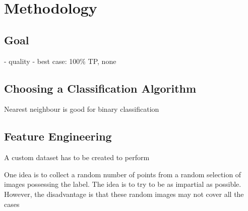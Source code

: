 \documentclass[dissertation.tex]{subfiles}
\begin{document}
\chapter{Methodology}

\section{Goal}
- quality - best case: 100\% TP, none

\section{Choosing a Classification Algorithm}
Nearest neighbour is good for binary classification

\section{Feature Engineering}
A custom dataset has to be created to perform 

One idea is to collect a random number of points from a random selection of images possessing the label. The idea is to try to be as impartial as possible. However, the disadvantage is that these random images may not cover all the cases
\end{document}
